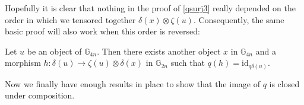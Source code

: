 Hopefully it is clear that nothing in the proof of \cref{qsurj3} really depended on the order in which we tensored together $\delta(x) \otimes \zeta(u)$. Consequently, the same basic proof will also work when this order is reversed:

\begin{cor}\label{qsurj4} Let $u$ be an object of $\mathbb{G}_{4n}$. Then there exists another object $x$ in $\mathbb{G}_{4n}$ and a morphism $h: \delta(u) \to \zeta(u) \otimes \delta(x)$ in $\mathbb{G}_{2n}$ such that $q(h) = \mathrm{id}_{q\delta(u)}$.
\end{cor}

Now we finally have enough results in place to show that the image of $q$ is closed under composition.

